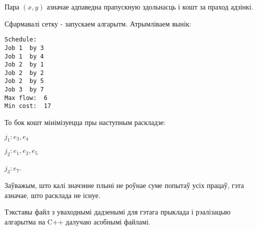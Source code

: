 \documentclass{article}
\begin{document}
Пара $(x,y)$ азначае адпаведна прапускную здольнасць і кошт за праход адзінкі.

Сфармавалі сетку - запускаем алгарытм. Атрымліваем вынік:
\begin{verbatim}
Schedule: 
Job 1  by 3
Job 1  by 4
Job 2  by 1
Job 2  by 2
Job 2  by 5
Job 3  by 7
Max flow:  6
Min cost:  17
\end{verbatim}

То бок кошт мінімізуецца пры наступным раскладзе:

$j_1: e_3, e_4$

$j_2: e_1, e_2, e_5$

$j_3: e_7$.

Заўважым, што калі значэнне плыні не роўнае суме попытаў усіх працаў, гэта азначае,
што расклада не існуе.

Тэкставы файл з уваходнымі дадзенымі для гэтага прыклада і рэалізацыю алгарытма на C++ далучаю асобнымі файламі.
\end{document}

